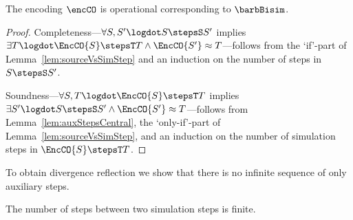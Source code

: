 \documentclass[]{eptcs}
\begin{document}
\begin{theorem}
	The encoding $ \encCO $ is operational corresponding \wrt to $ \barbBisim $.
	\label{thm:operationalCorrespondenceCentral}
\end{theorem}

\begin{proof}
	Completeness---$ \forall S, S' \logdot S \stepsS S' $ implies $ \exists T \logdot \EncCO{S} \stepsT T \wedge \EncCO{S'} \approx T $---follows from the `if'-part of Lemma~\ref{lem:sourceVsSimStep} and an induction on the number of steps in $ S \stepsS S' $.
	
	Soundness---$ \forall S, T \logdot \EncCO{S} \stepsT T $ implies $ \exists S' \logdot S \stepsS S' \wedge \EncCO{S'} \approx T $---follows from Lemma~\ref{lem:auxStepsCentral}, the `only-if'-part of Lemma~\ref{lem:sourceVsSimStep}, and an induction on the number of simulation steps in $ \EncCO{S} \stepsT T $.
\end{proof}

To obtain divergence reflection we show that there is no infinite sequence of only auxiliary steps.

\begin{lemma}
	The number of steps between two simulation steps is finite.
	\label{lem:numberStepsCentral}
\end{lemma}
\end{document}

